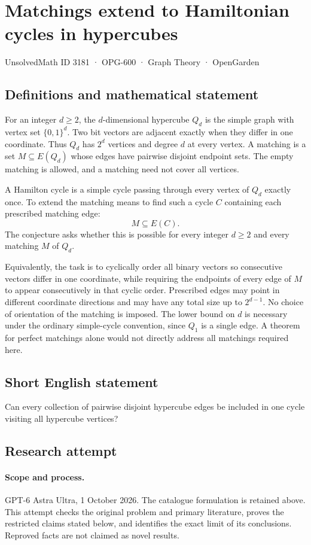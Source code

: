 \documentclass[11pt,a4paper]{article}
\begin{document}
\section*{Matchings extend to Hamiltonian cycles in hypercubes}\label{3181}
{\small UnsolvedMath ID 3181 · OPG-600 · Graph Theory · OpenGarden}
\subsection{Definitions and mathematical statement}
For an integer $d\geq2$, the $d$-dimensional hypercube
$Q_d$ is the simple graph with vertex set $\{0,1\}^d$.
Two bit vectors are adjacent exactly when they differ
in one coordinate. Thus $Q_d$ has $2^d$ vertices and
degree $d$ at every vertex. A matching is a set
$M\subseteq E(Q_d)$ whose edges have pairwise disjoint
endpoint sets. The empty matching is allowed, and a
matching need not cover all vertices.

A Hamilton cycle is a simple cycle passing through
every vertex of $Q_d$ exactly once. To extend the
matching means to find such a cycle $C$ containing
each prescribed matching edge:
\[
 M\subseteq E(C).
\]
The conjecture asks whether this is possible for every
integer $d\geq2$ and every matching $M$ of $Q_d$.

Equivalently, the task is to cyclically order all binary
vectors so consecutive vectors differ in one coordinate,
while requiring the endpoints of every edge of $M$ to
appear consecutively in that cyclic order. Prescribed
edges may point in different coordinate directions and
may have any total size up to $2^{d-1}$. No choice of
orientation of the matching is imposed. The lower bound
on $d$ is necessary under the ordinary simple-cycle
convention, since $Q_1$ is a single edge. A theorem for
perfect matchings alone would not directly address all
matchings required here.
\subsection{Short English statement}
Can every collection of pairwise disjoint hypercube edges be included in one cycle visiting all hypercube vertices?
\subsection{Research attempt}
\paragraph{Scope and process.}
GPT-6 Astra Ultra, 1 October 2026. The catalogue formulation is retained above. This attempt checks the original problem and primary literature, proves the restricted claims stated below, and identifies the exact limit of its conclusions. Reproved facts are not claimed as novel results.
\end{document}
